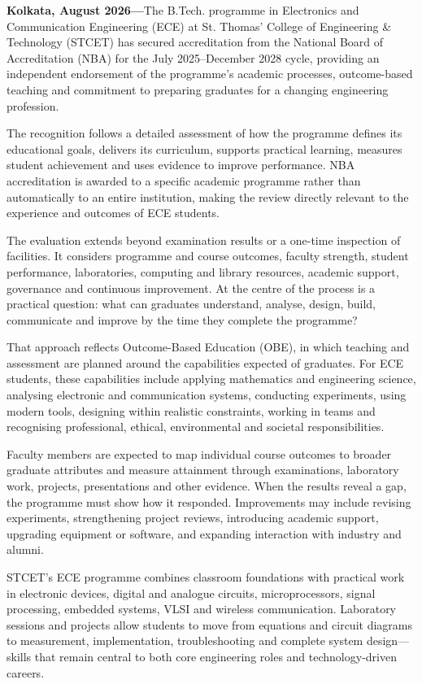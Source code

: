 {\small
\noindent
\textbf{Kolkata, August 2026---}The B.Tech. programme in Electronics and Communication Engineering (ECE) at St. Thomas' College of Engineering \& Technology (STCET) has secured accreditation from the National Board of Accreditation (NBA) for the July 2025--December 2028 cycle, providing an independent endorsement of the programme's academic processes, outcome-based teaching and commitment to preparing graduates for a changing engineering profession.

\medskip
\noindent
The recognition follows a detailed assessment of how the programme defines its educational goals, delivers its curriculum, supports practical learning, measures student achievement and uses evidence to improve performance. NBA accreditation is awarded to a specific academic programme rather than automatically to an entire institution, making the review directly relevant to the experience and outcomes of ECE students.

\medskip
\noindent
The evaluation extends beyond examination results or a one-time inspection of facilities. It considers programme and course outcomes, faculty strength, student performance, laboratories, computing and library resources, academic support, governance and continuous improvement. At the centre of the process is a practical question: what can graduates understand, analyse, design, build, communicate and improve by the time they complete the programme?

\medskip
\noindent
That approach reflects Outcome-Based Education (OBE), in which teaching and assessment are planned around the capabilities expected of graduates. For ECE students, these capabilities include applying mathematics and engineering science, analysing electronic and communication systems, conducting experiments, using modern tools, designing within realistic constraints, working in teams and recognising professional, ethical, environmental and societal responsibilities.

\medskip
\noindent
Faculty members are expected to map individual course outcomes to broader graduate attributes and measure attainment through examinations, laboratory work, projects, presentations and other evidence. When the results reveal a gap, the programme must show how it responded. Improvements may include revising experiments, strengthening project reviews, introducing academic support, upgrading equipment or software, and expanding interaction with industry and alumni.

\medskip
\noindent
STCET's ECE programme combines classroom foundations with practical work in electronic devices, digital and analogue circuits, microprocessors, signal processing, embedded systems, VLSI and wireless communication. Laboratory sessions and projects allow students to move from equations and circuit diagrams to measurement, implementation, troubleshooting and complete system design---skills that remain central to both core engineering roles and technology-driven careers.

}

